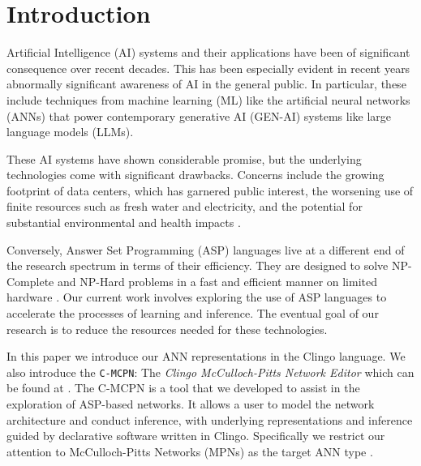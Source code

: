 \section{Introduction}

Artificial Intelligence (AI) systems and their applications have been of significant consequence over recent decades. This has been especially evident in recent years abnormally significant awareness of AI in the general public. In particular, these include techniques from machine learning (ML) like the artificial neural networks (ANNs) that power contemporary generative AI (GEN-AI) systems like large language models (LLMs).

These AI systems have shown considerable promise, but the underlying technologies come with significant drawbacks. Concerns include the growing footprint of data centers, which has garnered public interest, the worsening use of finite resources such as fresh water and electricity, and the potential for substantial environmental and health impacts \parencite{Han2025,Siddik2021,Li2023}.

Conversely, Answer Set Programming (ASP) languages live at a different end of the research spectrum in terms of their efficiency. They are designed to solve NP-Complete and NP-Hard problems in a fast and efficient manner on limited hardware \parencite{Gebser2019}. Our current work involves exploring the use of ASP languages to accelerate the processes of learning and inference. The eventual goal of our research is to reduce the resources needed for these technologies.

In this paper we introduce our ANN representations in the Clingo language. We also introduce the {\tt C-MCPN}: The \emph{Clingo McCulloch-Pitts Network Editor} which can be found at \cite{CMCPN2026}. The C-MCPN is a tool that we developed to assist in the exploration of ASP-based networks. It allows a user to model the network architecture and conduct inference, with underlying representations and inference guided by declarative software written in Clingo. Specifically we restrict our attention to McCulloch-Pitts Networks (MPNs) as the target ANN type \parencite{McCulloch1943}.
